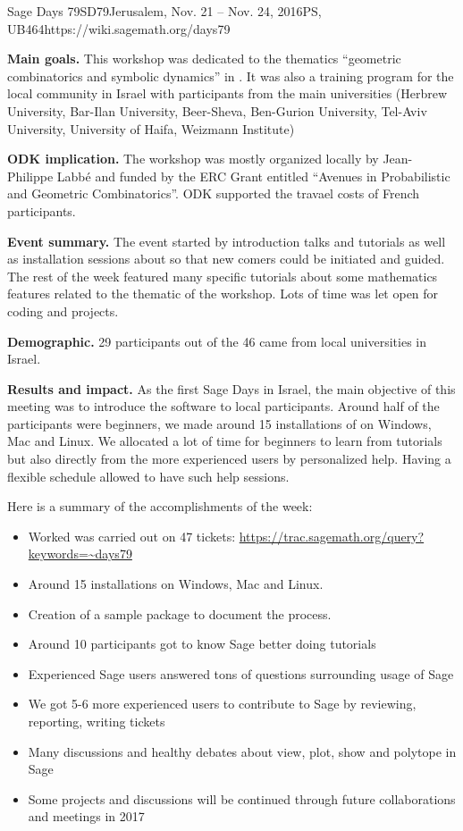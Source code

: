 \begin{event}{Sage Days 79}{SD79}{Jerusalem, Nov. 21 -- Nov. 24, 2016}{PS, UB}{46}{4}{https://wiki.sagemath.org/days79}

\textbf{Main goals.} This workshop was dedicated to the thematics ``geometric combinatorics and symbolic dynamics'' in \Sage. It was also a training program
for the local community in Israel with participants from the main universities (Herbrew University, Bar-Ilan University, Beer-Sheva, Ben-Gurion University, Tel-Aviv University, University of Haifa, Weizmann Institute)

\textbf{ODK implication.} The workshop was mostly organized locally by Jean-Philippe Labbé and funded by the ERC Grant entitled ``Avenues in Probabilistic and Geometric Combinatorics''. ODK supported the travael costs of French participants.

\textbf{Event summary.} The event started by introduction talks and tutorials as well as installation sessions about \Sage so that new comers could be initiated and guided. The rest of the week featured many specific tutorials about some mathematics features related to the thematic of the workshop. Lots of time was let open for coding and projects.

\textbf{Demographic.} 29 participants out of the 46 came from local universities in Israel. 

\textbf{Results and impact.} As the first Sage Days in Israel, the main objective of this meeting was to introduce the software to local participants. Around half of the participants were beginners, we made around 15 installations of \Sage on Windows, Mac and Linux. We allocated a lot of time for beginners to learn from tutorials but also directly from the more experienced users by personalized help. Having a flexible schedule allowed to have such help sessions.

Here is a summary of the accomplishments of the week:

\begin{itemize}
    \item    Worked was carried out on 47 \Sage tickets: \url{https://trac.sagemath.org/query?keywords=~days79}
    \item    Around 15 installations on Windows, Mac and Linux.
    \item    Creation of a sample \Sage package to document the process.
    \item    Around 10 participants got to know Sage better doing tutorials
    \item    Experienced Sage users answered tons of questions surrounding usage of Sage
    \item    We got 5-6 more experienced users to contribute to Sage by reviewing, reporting, writing tickets
    \item    Many discussions and healthy debates about view, plot, show and polytope in Sage
    \item    Some projects and discussions will be continued through future collaborations and meetings in 2017 
\end{itemize}


\end{event}